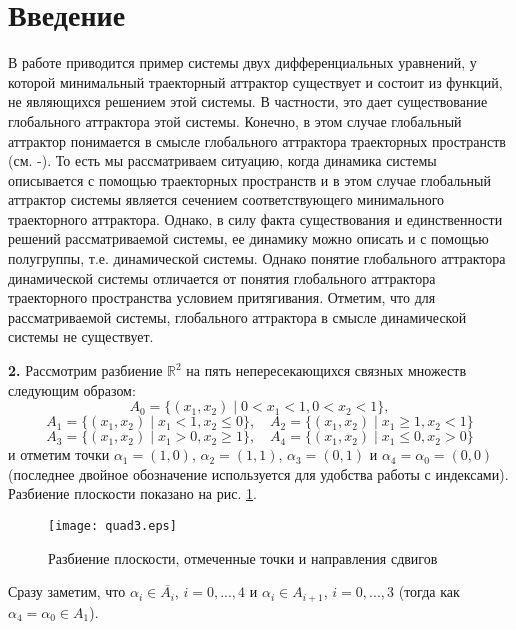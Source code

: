 \section{Введение}

В работе приводится пример системы двух дифференциальных уравнений, у которой минимальный траекторный аттрактор существует и состоит из функций, не являющихся решением этой системы. В частности, это дает существование глобального аттрактора этой системы. Конечно, в этом случае глобальный аттрактор понимается в смысле глобального аттрактора траекторных пространств (см. \cite{Chepyzhov}-\cite{umn}). То есть мы рассматриваем ситуацию, когда динамика системы описывается с помощью траекторных пространств и в этом случае глобальный аттрактор системы является сечением соответствующего минимального траекторного аттрактора. Однако, в силу факта существования и единственности решений рассматриваемой системы, ее динамику можно описать и с помощью полугруппы, т.е. динамической системы. Однако понятие глобального аттрактора динамической системы отличается от понятия глобального аттрактора траекторного пространства условием притягивания. Отметим, что для рассматриваемой системы, глобального аттрактора в смысле динамической системы не существует.

\par\medskip
\noindent \textbf{2.} Рассмотрим разбиение  $\mathbb{R}^2$ на пять непересекающихся связных множеств следующим образом:
$$
	A_0 = \{ (x_1, x_2) \mid 0 < x_1 < 1, 0 < x_2 < 1\},
$$
$$
	A_1 = \{ (x_1, x_2) \mid x_1 < 1, x_2 \leq 0  \}, \quad
	A_2 = \{ (x_1, x_2) \mid x_1 \geq 1, x_2 < 1  \}
$$
$$
	A_3 = \{ (x_1, x_2) \mid x_1 > 0, x_2 \geq 1  \}, \quad
	A_4 = \{ (x_1, x_2) \mid x_1 \leq 0, x_2 > 0  \}
$$
и отметим точки
$\alpha_1=(1, 0)$,
$\alpha_2=(1, 1)$,
$\alpha_3=(0, 1)$ и
$\alpha_4=\alpha_0=(0, 0)$
(последнее двойное обозначение используется для удобства работы с индексами).
Разбиение плоскости показано на рис. \ref{fig:somelabel}.

\begin{figure}[h]
	\centering
	\texttt{[image: quad3.eps]}
	\caption{Разбиение плоскости, отмеченные точки и направления сдвигов}
	\label{fig:somelabel}
\end{figure}

Сразу заметим, что $\alpha_i \in \overline{A_i}$, $i=0,...,4$ и
$\alpha_i \in A_{i+1}$, $i=0,...,3$ (тогда как $\alpha_4 = \alpha_0 \in A_{1}$).

